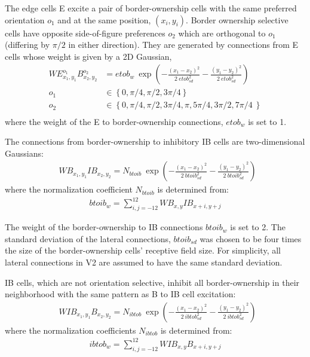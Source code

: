 The edge cells E excite a pair of border-ownership cells with the same
preferred orientation $o_1$
and at the same position, $(x_i,y_i)$.  Border ownership selective
cells have opposite 
side-of-figure preferences
$o_2$ which are orthogonal to $o_1$
(\ie differing by $\pi/2$ in either direction).
They are generated by
connections from E cells whose  weight is given by  a 2D Gaussian, 
\begin{align}
	WE^{o_1}_{x_1,y_1}B^{o_2}_{x_2,y_2}&=etob_w \:	\exp\left(-\frac{(x_1-x_2)^2}{2\: etob_{sd} ^2}-\frac{(y_1-y_2)^2}{2\: etob_{sd} ^2}\right)\ \nonumber\\
	o_1&\in \left\{0,\pi/4,\pi/2,3\pi/4 \right\} \nonumber\\
	o_2&\in \left\{0,\pi/4,\pi/2,3\pi/4,\pi,5\pi/4,3\pi/2,7\pi/4\ \right\} \nonumber\\
\end{align}
where the weight of the E to border-ownership connections, $etob_w$ is set to 1.

The connections from border-ownership to inhibitory IB cells are two-dimensional Gaussians: 
\begin{align}
	&WB_{x_1,y_1}IB_{x_2,y_2}=N_{btoib}\: \exp\left(-\frac{(x_1-x_2)^2}{2\: btoib_{sd}^2}-\frac{(y_1-y_2)^2}{2\: btoib_{sd}^2}\right)\
\end{align}
where the normalization coefficient $N_{btoib}$ is determined from:
\begin{align}
	btoib_w = \sum^{12}_{i,j=-12} WB_{x,y}IB_{x+i,y+j}
\end{align}

The weight of the border-ownership to IB connections $btoib_w$ is set to 2. The standard deviation of the lateral connections,
$btoib_{sd}$ was chosen to be four times the size of the border-ownership cells' receptive field size. For simplicity, all lateral connections in V2 are assumed to have the same standard deviation.

IB cells, which are not orientation selective, inhibit all border-ownership in their neighborhood with the same pattern as B to IB cell excitation:
\begin{align}
	&WIB_{x_1,y_1}B_{x_2,y_2}=N_{ibtob}\: \exp\left(-\frac{(x_1-x_2)^2}{2\: ibtob_{sd}^2}-\frac{(y_1-y_2)^2}{2\: ibtob_{sd}^2}\right)\
\end{align}
where the normalization coefficients $N_{ibtob}$ is determined from:
\begin{align}
	ibtob_w = \sum^{12}_{i,j=-12} WIB_{x,y}B_{x+i,y+j}
\end{align}

